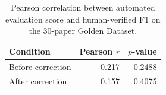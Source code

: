 \begin{table}[htbp]
\centering
\caption{Pearson correlation between automated evaluation score and human-verified F1 on the 30-paper Golden Dataset.}
\label{tab:score_correlation}
\begin{tabular}{lrr}
\toprule
Condition & Pearson $r$ & $p$-value \\
\midrule
  Before correction & 0.217 & 0.2488 \\
  After correction & 0.157 & 0.4075 \\
\bottomrule
\end{tabular}
\end{table}